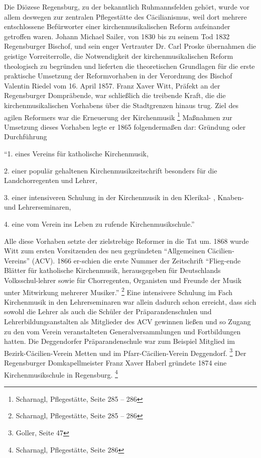Die Diözese Regensburg, zu der bekanntlich Ruhmannsfelden gehört, wurde
vor allem deswegen zur zentralen Pflegestätte des Cäcilianismus, weil
dort mehrere entschlossene Befürworter einer kirchenmusikalischen
Reform aufeinander getroffen waren. Johann Michael Sailer, von 1830 bis
zu seinem Tod 1832 Regensburger Bischof, und sein enger Vertrauter Dr.
Carl Proske übernahmen die geistige Vorreiterrolle, die Notwendigkeit
der kirchenmusikalischen Reform theologisch zu begründen und lieferten
die theoretischen Grundlagen für die erste praktische Umsetzung der
Reformvorhaben in der Verordnung des Bischof Valentin Riedel vom 16.
April 1857. Franz Xaver Witt, Präfekt an der Regensburger Dompräbende,
war schließlich die treibende Kraft, die die kirchenmusikalischen
Vorhabens über die Stadtgrenzen hinaus trug. Ziel des agilen Reformers
war die Erneuerung der Kirchenmusik  \footnote{Scharnagl,
Pflegestätte, Seite 285 – 286} Maßnahmen zur Umsetzung dieses Vorhaben
legte er 1865 folgendermaßen dar: Gründung oder Durchführung

“1. eines Vereins für katholische Kirchenmusik,

2. einer populär gehaltenen Kirchenmusikzeitschrift besonders für die
Landchorregenten und Lehrer,

3. einer intensiveren Schulung in der Kirchenmusik in den Klerikal- ,
Knaben- und Lehrerseminaren,

4. eine vom Verein ins Leben zu rufende Kirchenmusikschule.”

Alle diese Vorhaben setzte der zielstrebige Reformer in die Tat um. 1868
wurde Witt zum ersten Vorsitzenden des neu gegründeten “Allgemeinen
Cäcilien-Vereins” (ACV). 1866 er-schien die erste Nummer der
Zeitschrift “Flieg-ende Blätter für katholische Kirchenmusik,
herausgegeben für Deutschlands Volksschul-lehrer sowie für
Chorregenten, Organisten und Freunde der Musik unter Mitwirkung
mehrerer Musiker.” \footnote{Scharnagl, Pflegestätte, Seite 285 – 286}
Eine intensivere Schulung im Fach Kirchenmusik in den Lehrerseminaren
war allein dadurch schon erreicht, dass sich sowohl die Lehrer als auch
die Schüler der Präparandenschulen und Lehrerbildungsanstalten als
Mitglieder des ACV gewinnen ließen und so Zugang zu den vom Verein
veranstalteten Generalversammlungen und Fortbildungen hatten. Die
Deggendorfer Präparandenschule war zum Beispiel Mitglied im
Bezirk-Cäcilien-Verein Metten und im Pfarr-Cäcilien-Verein
Deggendorf. \footnote{Goller, Seite 47} Der Regensburger
Domkapellmeister Franz Xaver Haberl gründete 1874 eine
Kirchenmusikschule in Regensburg. \footnote{Scharnagl, Pflegestätte,
Seite 286}

